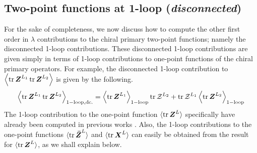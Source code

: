 \subsection{Two-point functions at 1-loop (\textit{disconnected})}
For the sake of completeness, we now discuss how to compute the other first order in $\lambda$ contributions to the chiral primary two-point functions; namely the disconnected 1-loop contributions. These disconnected 1-loop contributions are given simply in terms of 1-loop contributions to one-point functions of the chiral primary operators. For example, the disconnected 1-loop contribution to $\expval{\tr \boldsymbol{Z}^{L_1} \tr \boldsymbol{Z}^{L_2}}$ is given by the following.
%
%
\begin{equation}
\expval{\tr \boldsymbol{Z}^{L_1} \tr \boldsymbol{Z}^{L_2}}_{\mathrm{1-loop,dc.}}
=
\expval{\tr \boldsymbol{Z}^{L_1}}_{\mathrm{1-loop}}
\tr \mathcal{Z}^{L_2}
+
\tr \mathcal{Z}^{L_1}
\expval{\tr \boldsymbol{Z}^{L_2}}_{\mathrm{1-loop}}
\end{equation}
%
%
The 1-loop contribution to the one-point function $\langle \tr \boldsymbol{Z}^{L} \rangle$ specifically have already been computed in previous works \cite{One-point functions in D3-D7, One-point functions in D3-D7 SO(5)}. Also, the 1-loop contributions to the one-point functions $\langle \tr \boldsymbol{\bar{Z}}^{L} \rangle$ and $\langle \tr \boldsymbol{X}^{L} \rangle$ can easily be obtained from the result for $\langle \tr \boldsymbol{Z}^{L} \rangle$, as we shall explain below.

